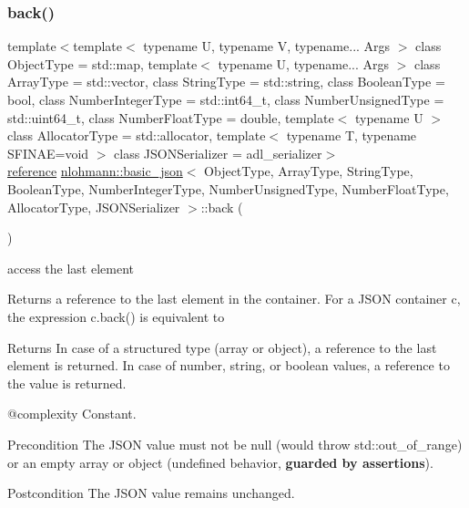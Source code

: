 \subsubsection{\texorpdfstring{back()}{back()}\hspace{0.1cm}{\footnotesize\ttfamily [1/2]}}
{\footnotesize\ttfamily template$<$template$<$ typename U, typename V, typename... Args $>$ class Object\+Type = std\+::map, template$<$ typename U, typename... Args $>$ class Array\+Type = std\+::vector, class String\+Type  = std\+::string, class Boolean\+Type  = bool, class Number\+Integer\+Type  = std\+::int64\+\_\+t, class Number\+Unsigned\+Type  = std\+::uint64\+\_\+t, class Number\+Float\+Type  = double, template$<$ typename U $>$ class Allocator\+Type = std\+::allocator, template$<$ typename T, typename S\+F\+I\+N\+A\+E=void $>$ class J\+S\+O\+N\+Serializer = adl\+\_\+serializer$>$ \\
\mbox{\hyperlink{classnlohmann_1_1basic__json_ac6a5eddd156c776ac75ff54cfe54a5bc}{reference}} \mbox{\hyperlink{classnlohmann_1_1basic__json}{nlohmann\+::basic\+\_\+json}}$<$ Object\+Type, Array\+Type, String\+Type, Boolean\+Type, Number\+Integer\+Type, Number\+Unsigned\+Type, Number\+Float\+Type, Allocator\+Type, J\+S\+O\+N\+Serializer $>$\+::back (\begin{DoxyParamCaption}{ }\end{DoxyParamCaption})\hspace{0.3cm}{\ttfamily [inline]}}



access the last element 

Returns a reference to the last element in the container. For a J\+S\+ON container {\ttfamily c}, the expression {\ttfamily c.\+back()} is equivalent to 
\begin{DoxyCode}{0}
\end{DoxyCode}


\begin{DoxyReturn}{Returns}
In case of a structured type (array or object), a reference to the last element is returned. In case of number, string, or boolean values, a reference to the value is returned.
\end{DoxyReturn}
@complexity Constant.

\begin{DoxyPrecond}{Precondition}
The J\+S\+ON value must not be {\ttfamily null} (would throw {\ttfamily std\+::out\+\_\+of\+\_\+range}) or an empty array or object (undefined behavior, {\bfseries{guarded by assertions}}). 
\end{DoxyPrecond}
\begin{DoxyPostcond}{Postcondition}
The J\+S\+ON value remains unchanged.
\end{DoxyPostcond}

